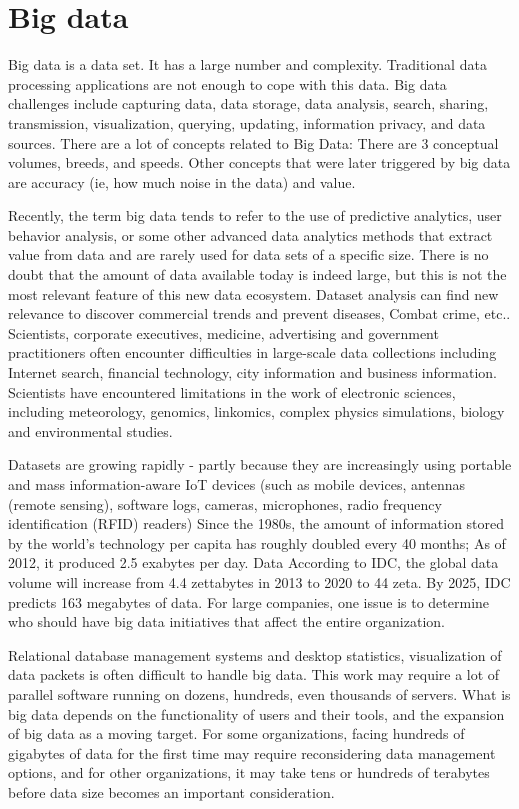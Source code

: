 \section{Big data}

Big data is a data set. It has a large number and complexity. 
Traditional data processing applications are not enough to cope with 
this data. Big data challenges include capturing data, data storage, 
data analysis, search, sharing, transmission, visualization, querying,
 updating, information privacy, and data sources. There are a lot of 
concepts related to Big Data: There are 3 conceptual volumes, breeds,
 and speeds. Other concepts that were later triggered by big data are
 accuracy (ie, how much noise in the data) and value.

Recently, the term big data tends to refer to the use of predictive 
analytics, user behavior analysis, or some other advanced data 
analytics methods that extract value from data and are rarely used for
 data sets of a specific size. There is no doubt that the amount of 
data available today is indeed large, but this is not the most 
relevant feature of this new data ecosystem. Dataset analysis can 
find new relevance to discover commercial trends and prevent 
diseases, Combat crime, etc..  Scientists, corporate executives, 
medicine, advertising and government practitioners often encounter 
difficulties in large-scale data collections including Internet 
search, financial technology, city information and business 
information. Scientists have encountered limitations in the work of 
electronic sciences, including meteorology, genomics, linkomics, 
complex physics simulations, biology and environmental studies.

Datasets are growing rapidly - partly because they are increasingly 
using portable and mass information-aware IoT devices (such as mobile
 devices, antennas (remote sensing), software logs, cameras, 
microphones, radio frequency identification (RFID) readers) Since 
the 1980s, the amount of information stored by the world's technology
 per capita has roughly doubled every 40 months; As of 2012, it 
produced 2.5 exabytes per day. Data According to IDC, the global 
data volume will increase from 4.4 zettabytes in 2013 to 2020 to 44 
zeta. By 2025, IDC predicts 163 megabytes of data. For large 
companies, one issue is to determine who should have big data 
initiatives that affect the entire organization.

Relational database management systems and desktop statistics, 
visualization of data packets is often difficult to handle big data. 
This work may require a lot of parallel software running on dozens, 
hundreds, even thousands of servers. What is big data depends on the 
functionality of users and their tools, and the expansion of big data
 as a moving target. For some organizations, facing hundreds of 
gigabytes of data for the first time may require reconsidering data 
management options, and for other organizations, it may take tens or 
hundreds of terabytes before data size becomes an important 
consideration.

